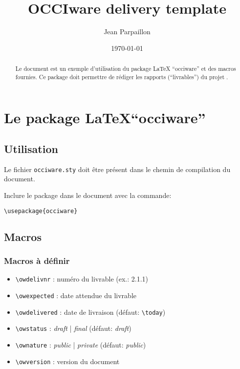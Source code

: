 \documentclass[a4paper,11pt,twoside]{report}
\begin{document}
\title{OCCIware delivery template}

\author{Jean Parpaillon}


\date{\today}

\maketitle

\begin{abstract}
  Le document est un exemple d'utilisation du package \LaTeX
  ``occiware'' et des macros fournies. Ce package doit permettre de
  rédiger les rapports (``livrables'') du projet \occiware.
\end{abstract}

\chapter{Le package \LaTeX ``occiware''}
\label{chap:one}

\section{Utilisation}
\label{sec:utilisation}

Le fichier \texttt{occiware.sty} doit être présent dans le chemin de
compilation du document.

Inclure le package dans le document avec la commande:

\begin{verbatim}
\usepackage{occiware}
\end{verbatim}

\section{Macros}
\label{sec:macros}

\subsection{Macros à définir}

\begin{itemize}
\item \verb+\owdelivnr+ : numéro du livrable (ex.: 2.1.1)
\item \verb+\owexpected+ : date attendue du livrable
\item \verb+\owdelivered+ : date de livraison (défaut: \verb+\today+)
\item \verb+\owstatus+ : \textit{draft} | \textit{final} (défaut: \textit{draft})
\item \verb+\ownature+ : \textit{public} | \textit{private} (défaut: \textit{public})
\item \verb+\owversion+ : version du document
\end{itemize}
\end{document}
